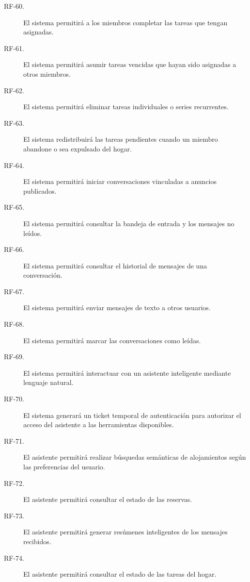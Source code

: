 \begin{description}
    \item[RF-60.] El sistema permitirá a los miembros completar las tareas que tengan asignadas.

    \item[RF-61.] El sistema permitirá asumir tareas vencidas que hayan sido asignadas a otros miembros.

    \item[RF-62.] El sistema permitirá eliminar tareas individuales o series recurrentes.

    \item[RF-63.] El sistema redistribuirá las tareas pendientes cuando un miembro abandone o sea expulsado del hogar.

    \item[RF-64.] El sistema permitirá iniciar conversaciones vinculadas a anuncios publicados.

    \item[RF-65.] El sistema permitirá consultar la bandeja de entrada y los mensajes no leídos.

    \item[RF-66.] El sistema permitirá consultar el historial de mensajes de una conversación.

    \item[RF-67.] El sistema permitirá enviar mensajes de texto a otros usuarios.

    \item[RF-68.] El sistema permitirá marcar las conversaciones como leídas.

    \item[RF-69.] El sistema permitirá interactuar con un asistente inteligente mediante lenguaje natural.

    \item[RF-70.] El sistema generará un ticket temporal de autenticación para autorizar el acceso del asistente a las herramientas disponibles.

    \item[RF-71.] El asistente permitirá realizar búsquedas semánticas de alojamientos según las preferencias del usuario.

    \item[RF-72.] El asistente permitirá consultar el estado de las reservas.

    \item[RF-73.] El asistente permitirá generar resúmenes inteligentes de los mensajes recibidos.

    \item[RF-74.] El asistente permitirá consultar el estado de las tareas del hogar.


\end{description}
